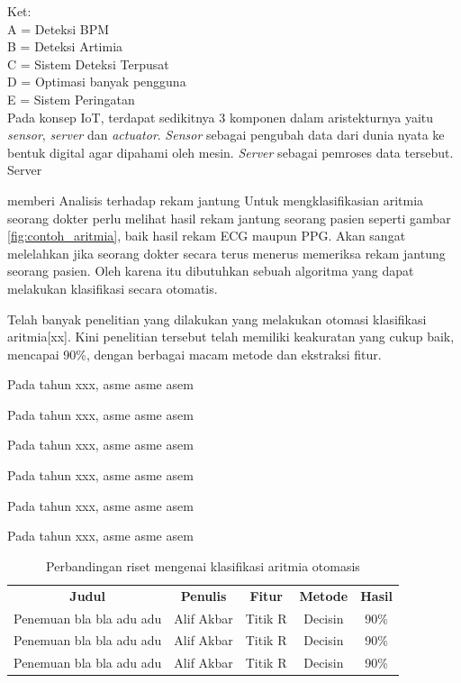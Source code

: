 Ket: \\
A = Deteksi BPM \\
B = Deteksi Artimia \\
C = Sistem Deteksi Terpusat \\
D = Optimasi banyak pengguna \\
E = Sistem Peringatan \\

Pada konsep IoT, terdapat sedikitnya 3 komponen dalam aristekturnya yaitu \textit{sensor}, \textit{server} dan \textit{actuator}. \textit{Sensor} sebagai pengubah data dari dunia nyata ke bentuk digital agar dipahami oleh mesin. \textit{Server} sebagai pemroses data tersebut. Server

memberi Analisis terhadap rekam jantung Untuk mengklasifikasian aritmia seorang dokter perlu melihat hasil rekam jantung seorang pasien seperti gambar \ref{fig:contoh_aritmia}, baik hasil rekam ECG maupun PPG. Akan sangat melelahkan jika seorang dokter secara terus menerus memeriksa rekam jantung seorang pasien. Oleh karena itu dibutuhkan sebuah algoritma yang dapat melakukan klasifikasi secara otomatis. 

Telah banyak penelitian yang dilakukan yang melakukan otomasi klasifikasi aritmia[xx]. Kini penelitian tersebut telah memiliki keakuratan yang cukup baik, mencapai 90\%, dengan berbagai macam metode dan ekstraksi fitur.

Pada tahun xxx, asme asme asem

Pada tahun xxx, asme asme asem

Pada tahun xxx, asme asme asem

Pada tahun xxx, asme asme asem

Pada tahun xxx, asme asme asem

Pada tahun xxx, asme asme asem

\begin{table}[H]
\centering
	\begin{tabular}{|c|c|c|c|c|}
	\hline
	\rowcolor{gray}
	\textbf{Judul} & \textbf{Penulis} & \textbf{Fitur} & \textbf{Metode}  & \textbf{Hasil}\\
	\cline{1-5}
	Penemuan bla bla adu adu & Alif Akbar & Titik R & Decisin & 90\% \\
	\cline{1-5}
	Penemuan bla bla adu adu & Alif Akbar & Titik R & Decisin & 90\% \\
	\cline{1-5}
	Penemuan bla bla adu adu & Alif Akbar & Titik R & Decisin & 90\% \\
	\hline
	\end{tabular}
	\caption{Perbandingan riset mengenai klasifikasi aritmia otomasis}
	\label{table:research_comparison}
\end{table}

